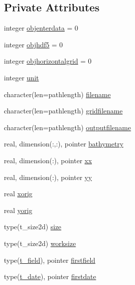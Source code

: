 \subsection*{Private Attributes}
\begin{DoxyCompactItemize}
\item 
integer \mbox{\hyperlink{structmodulearpsformat_1_1t__mm5format_a3c0d445f20df0948710739b5a5118d4d}{objenterdata}} = 0
\item 
integer \mbox{\hyperlink{structmodulearpsformat_1_1t__mm5format_a62f19bbe6be78fe1f39640e5afc5af6d}{objhdf5}} = 0
\item 
integer \mbox{\hyperlink{structmodulearpsformat_1_1t__mm5format_a8eeb1f3ee2b41f18a6b701c3de338c45}{objhorizontalgrid}} = 0
\item 
integer \mbox{\hyperlink{structmodulearpsformat_1_1t__mm5format_aecbba1cf39a04c82544843f1a12e0cc3}{unit}}
\item 
character(len=pathlength) \mbox{\hyperlink{structmodulearpsformat_1_1t__mm5format_a3dc256e8e9dd70b5717177fa8baef8ee}{filename}}
\item 
character(len=pathlength) \mbox{\hyperlink{structmodulearpsformat_1_1t__mm5format_ac03f323173809ea6b40d1826a1e043df}{gridfilename}}
\item 
character(len=pathlength) \mbox{\hyperlink{structmodulearpsformat_1_1t__mm5format_a08f125c50ab12573d76c30a71b7642d7}{outputfilename}}
\item 
real, dimension(\+:,\+:), pointer \mbox{\hyperlink{structmodulearpsformat_1_1t__mm5format_a5f8e1e52bd82e590897c6ed5b4567815}{bathymetry}}
\item 
real, dimension(\+:), pointer \mbox{\hyperlink{structmodulearpsformat_1_1t__mm5format_a9a18ee0dafa0632550ac53c959a19a5c}{xx}}
\item 
real, dimension(\+:), pointer \mbox{\hyperlink{structmodulearpsformat_1_1t__mm5format_ae84812469c67c437e191ebbadec89aed}{yy}}
\item 
real \mbox{\hyperlink{structmodulearpsformat_1_1t__mm5format_a0e16a34ea2e9819692624c5a0f0c6785}{xorig}}
\item 
real \mbox{\hyperlink{structmodulearpsformat_1_1t__mm5format_aa22482fc3863630fdc49ce6442c12463}{yorig}}
\item 
type(t\+\_\+size2d) \mbox{\hyperlink{structmodulearpsformat_1_1t__mm5format_a123507fb458ad5724ea11955413c32ea}{size}}
\item 
type(t\+\_\+size2d) \mbox{\hyperlink{structmodulearpsformat_1_1t__mm5format_ad51f9763362a2c98d67592095178bdd7}{worksize}}
\item 
type(\mbox{\hyperlink{structmodulearpsformat_1_1t__field}{t\+\_\+field}}), pointer \mbox{\hyperlink{structmodulearpsformat_1_1t__mm5format_a8991bee652d0a66be3635346c9aaf53d}{firstfield}}
\item 
type(\mbox{\hyperlink{structmodulearpsformat_1_1t__date}{t\+\_\+date}}), pointer \mbox{\hyperlink{structmodulearpsformat_1_1t__mm5format_af37e2c34bd70cbcc1e7dae7ed122dede}{firstdate}}
\end{DoxyCompactItemize}


